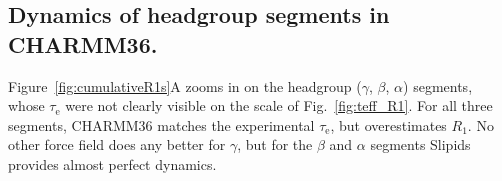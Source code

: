 \documentclass[journal=jpcbfk,manuscript=article,layout=twocolumn]{achemso}
\begin{document}

\subsection*{Dynamics of headgroup segments in CHARMM36.}

Figure~\ref{fig:cumulativeR1s}A zooms in on the headgroup ($\gamma$, $\beta$, $\alpha$) segments,
whose $\tau_\mathrm e$ were not clearly visible on the scale of Fig.~\ref{fig:teff_R1}.
%
For all three segments, CHARMM36 matches the experimental $\tau_\mathrm e$,
but overestimates $R_1$.
%
No other force field does any better for $\gamma$, but
for the $\beta$ and $\alpha$ segments Slipids provides almost perfect dynamics.
\end{document}
